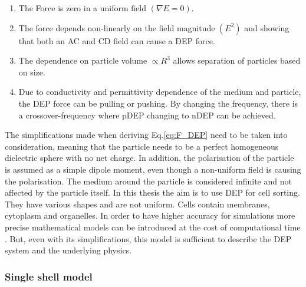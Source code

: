 \documentclass[final]{jyflluk}
\begin{document}
\begin{enumerate}
\renewcommand{\labelenumi}{\Roman{enumi}}  %
    \setlength{\itemsep}{1pt}
    \setlength{\parskip}{1pt}
    \item The Force is zero in a uniform field $(\nabla E=0)$.
    \item The force depends non-linearly on the field magnitude $(E^2)$ and showing that both an AC and CD field can cause a DEP force.
    \item The dependence on particle volume $\propto R^3$ allows separation of particles based on size.
    \item Due to conductivity and permittivity dependence of the medium and particle, the DEP force can be pulling or  pushing. By changing the frequency, there is a crossover-frequency where pDEP changing to nDEP can be achieved. \cite{zhang_dielectrophoresis_2010}
\end{enumerate}
The simplifications made when deriving Eq.\ref{eq:F_DEP} need to be taken into consideration, meaning that the particle needs to be a perfect homogeneous dielectric sphere with no net charge. In addition, the polarisation of the particle is assumed as a simple dipole moment, even though a non-uniform field is causing the polarisation.  The medium around the particle is considered infinite and not affected by the particle itself. \cite{pethig_review_2010} In this thesis the aim is to use DEP for cell sorting. They have various shapes and are not uniform. Cells contain membranes, cytoplasm and organelles. In order to have higher accuracy for simulations more precise mathematical models can be introduced at the cost of computational time \cite{jubery_dielectrophoretic_2014, cetin_dielectrophoresis_2011, pethig_review_2010, cottet_mydep_2019}. But, even with its simplifications, this model is sufficient to describe the DEP system and the underlying physics.

\subsubsection{Single shell model}
\label{sec:x3.2}
\end{document}
